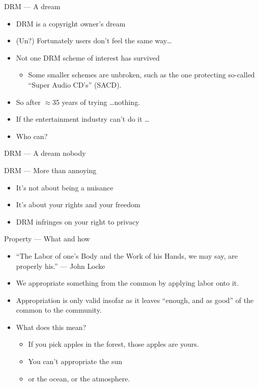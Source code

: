 \documentclass{beamer}
\begin{document}
\begin{frame}{DRM --- A dream}
    \begin{itemize}
        \item DRM is a copyright owner's dream\pause{}
        \item (Un?) Fortunately users don't feel the same way\ldots\pause{}
        \item Not one DRM scheme of interest has survived
        \begin{itemize}
            \item Some smaller schemes are unbroken, such as the one protecting so-called ``Super Audio CD's'' (SACD).\pause{}
        \end{itemize}
        \item So after \(\approx \)35 years of trying \ldots nothing.\pause{}
        \item If the entertainment industry can't do it \ldots\pause{}
        \item Who can?
    \end{itemize}
\end{frame}

\begin{frame}{DRM --- A dream}
    \Huge
    \vfill
    \centering
    nobody
    \vfill
\end{frame}

\begin{frame}{DRM --- More than annoying}
    \begin{itemize}
        \item It's not about being a nuisance\pause{}
        \item It's about your rights and your freedom\pause{}
        \item DRM infringes on your right to privacy
    \end{itemize}
\end{frame}

\begin{frame}{Property --- What and how}
    \begin{itemize}
        \item ``The Labor of one's Body and the Work of his Hands, we may say, are properly his.'' --- John Locke\pause{}
        \item We appropriate something from the common by applying labor onto it.\pause{}
        \item Appropriation is only valid insofar as it leaves ``enough, and as good'' of the common to the community.\pause{}
        \item What does this mean?
        \begin{itemize}
            \item If you pick apples in the forest, those apples are yours.\pause{}
            \item You can't appropriate the sun\pause{}
            \item or the ocean, or the atmosphere.
        \end{itemize}
    \end{itemize}
\end{frame}
\end{document}
